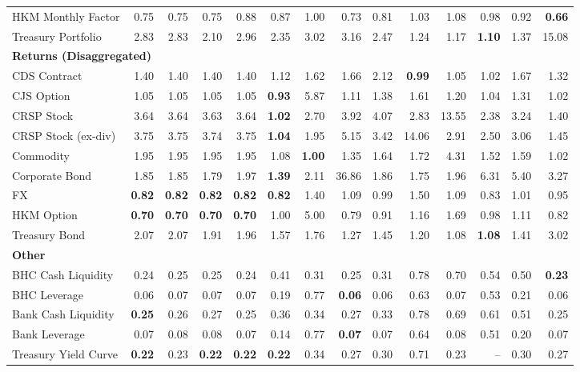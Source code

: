 \begin{table}[htbp]
\begin{tabular}{@{}lrrrrrrrrrrrrr@{}}
HKM Monthly Factor & 0.75 & 0.75 & 0.75 & 0.88 & 0.87 & 1.00 & 0.73 & 0.81 & 1.03 & 1.08 & 0.98 & 0.92 & \textbf{0.66} \\
Treasury Portfolio & 2.83 & 2.83 & 2.10 & 2.96 & 2.35 & 3.02 & 3.16 & 2.47 & 1.24 & 1.17 & \textbf{1.10} & 1.37 & 15.08 \\
\midrule
\multicolumn{14}{l}{\textbf{Returns (Disaggregated)}} \\
CDS Contract & 1.40 & 1.40 & 1.40 & 1.40 & 1.12 & 1.62 & 1.66 & 2.12 & \textbf{0.99} & 1.05 & 1.02 & 1.67 & 1.32 \\
CJS Option & 1.05 & 1.05 & 1.05 & 1.05 & \textbf{0.93} & 5.87 & 1.11 & 1.38 & 1.61 & 1.20 & 1.04 & 1.31 & 1.02 \\
CRSP Stock & 3.64 & 3.64 & 3.63 & 3.64 & \textbf{1.02} & 2.70 & 3.92 & 4.07 & 2.83 & 13.55 & 2.38 & 3.24 & 1.40 \\
CRSP Stock (ex-div) & 3.75 & 3.75 & 3.74 & 3.75 & \textbf{1.04} & 1.95 & 5.15 & 3.42 & 14.06 & 2.91 & 2.50 & 3.06 & 1.45 \\
Commodity & 1.95 & 1.95 & 1.95 & 1.95 & 1.08 & \textbf{1.00} & 1.35 & 1.64 & 1.72 & 4.31 & 1.52 & 1.59 & 1.02 \\
Corporate Bond & 1.85 & 1.85 & 1.79 & 1.97 & \textbf{1.39} & 2.11 & 36.86 & 1.86 & 1.75 & 1.96 & 6.31 & 5.40 & 3.27 \\
FX & \textbf{0.82} & \textbf{0.82} & \textbf{0.82} & \textbf{0.82} & \textbf{0.82} & 1.40 & 1.09 & 0.99 & 1.50 & 1.09 & 0.83 & 1.01 & 0.95 \\
HKM Option & \textbf{0.70} & \textbf{0.70} & \textbf{0.70} & \textbf{0.70} & 1.00 & 5.00 & 0.79 & 0.91 & 1.16 & 1.69 & 0.98 & 1.11 & 0.82 \\
Treasury Bond & 2.07 & 2.07 & 1.91 & 1.96 & 1.57 & 1.76 & 1.27 & 1.45 & 1.20 & 1.08 & \textbf{1.08} & 1.41 & 3.02 \\
\midrule
\multicolumn{14}{l}{\textbf{Other}} \\
BHC Cash Liquidity & 0.24 & 0.25 & 0.25 & 0.24 & 0.41 & 0.31 & 0.25 & 0.31 & 0.78 & 0.70 & 0.54 & 0.50 & \textbf{0.23} \\
BHC Leverage & 0.06 & 0.07 & 0.07 & 0.07 & 0.19 & 0.77 & \textbf{0.06} & 0.06 & 0.63 & 0.07 & 0.53 & 0.21 & 0.06 \\
Bank Cash Liquidity & \textbf{0.25} & 0.26 & 0.27 & 0.25 & 0.36 & 0.34 & 0.27 & 0.33 & 0.78 & 0.69 & 0.61 & 0.51 & 0.25 \\
Bank Leverage & 0.07 & 0.08 & 0.08 & 0.07 & 0.14 & 0.77 & \textbf{0.07} & 0.07 & 0.64 & 0.08 & 0.51 & 0.20 & 0.07 \\
Treasury Yield Curve & \textbf{0.22} & 0.23 & \textbf{0.22} & \textbf{0.22} & \textbf{0.22} & 0.34 & 0.27 & 0.30 & 0.71 & 0.23 & -- & 0.30 & 0.27 \\
\bottomrule
\end{tabular}
\vspace{0.1cm}

\end{table}
